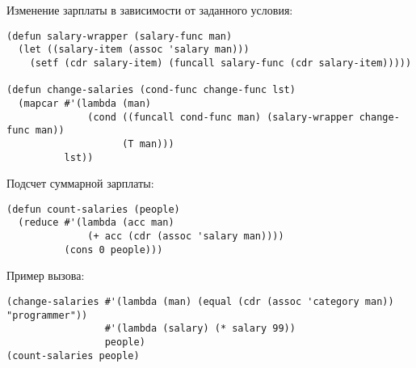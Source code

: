 Изменение зарплаты в зависимости от заданного условия:

\begin{lstlisting}
(defun salary-wrapper (salary-func man) 
  (let ((salary-item (assoc 'salary man)))
    (setf (cdr salary-item) (funcall salary-func (cdr salary-item)))))

(defun change-salaries (cond-func change-func lst)
  (mapcar #'(lambda (man) 
              (cond ((funcall cond-func man) (salary-wrapper change-func man))
                    (T man)))
          lst))
\end{lstlisting}

Подсчет суммарной зарплаты:

\begin{lstlisting}
(defun count-salaries (people)
  (reduce #'(lambda (acc man)
              (+ acc (cdr (assoc 'salary man))))
          (cons 0 people)))
\end{lstlisting}

Пример вызова:

\begin{lstlisting}
(change-salaries #'(lambda (man) (equal (cdr (assoc 'category man)) "programmer"))
                 #'(lambda (salary) (* salary 99)) 
                 people)
(count-salaries people)
\end{lstlisting}
